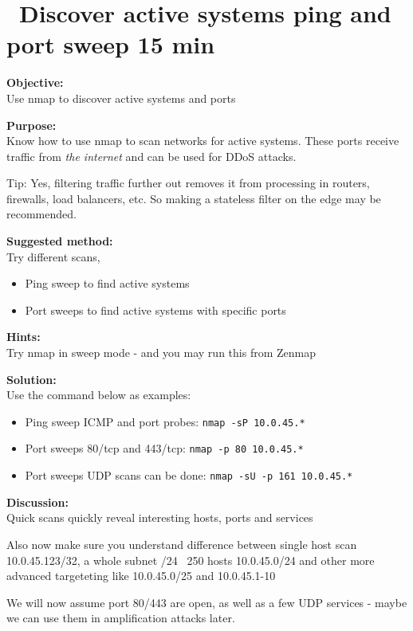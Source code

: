 \documentclass[a4paper,11pt,notitlepage]{report}
\begin{document}
\chapter{\faExclamationTriangle\ Discover active systems ping and port sweep 15 min}
\label{ex:nmap-pingsweep}

{\bf Objective:}\\
Use nmap to discover active systems and ports

{\bf Purpose:}\\
Know how to use nmap to scan networks for active systems. These ports receive traffic from \emph{the internet} and can be used for DDoS attacks.

Tip: Yes, filtering traffic further out removes it from processing in routers, firewalls, load balancers, etc. So making a stateless filter on the edge may be recommended.

{\bf Suggested method:}\\
Try different scans,
\begin{itemize}
\item Ping sweep to find active systems
\item Port sweeps to find active systems with specific ports
\end{itemize}

{\bf Hints:} \\
Try nmap in sweep mode - and you may run this from Zenmap

{\bf Solution:}\\
Use the command below as examples:
\begin{itemize}
\item Ping sweep ICMP and port probes: \verb+nmap -sP 10.0.45.*+
\item Port sweeps 80/tcp and 443/tcp: \verb+nmap -p 80 10.0.45.*+
\item Port sweeps UDP scans can be done: \verb+nmap -sU -p 161 10.0.45.*+
\end{itemize}

{\bf Discussion:}\\
Quick scans quickly reveal interesting hosts, ports and services

Also now make sure you understand difference between single host scan
10.0.45.123/32, a whole subnet /24 ~250 hosts 10.0.45.0/24 and other more advanced targeteting like 10.0.45.0/25 and 10.0.45.1-10

We will now assume port 80/443 are open, as well as a few UDP services - maybe we can use them in amplification attacks later.
\end{document}
